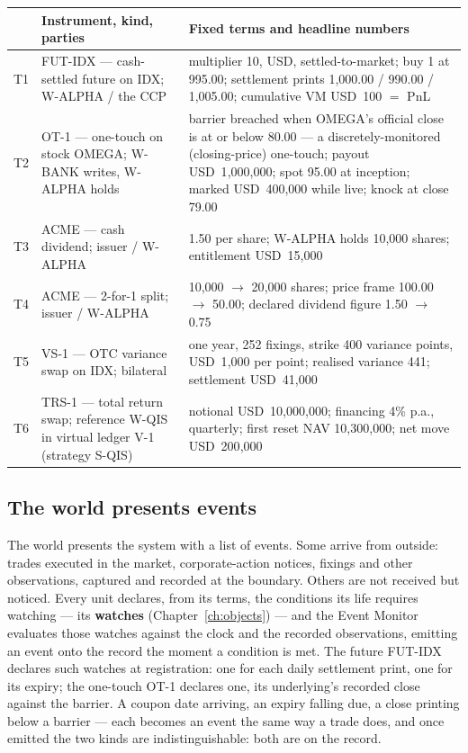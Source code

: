 \documentclass[11pt,a4paper]{article}
\newcommand{\USD}[1]{\mbox{USD~#1}}
\begin{document}
\medskip
{\small
\noindent\begin{tabular}{@{}lp{4.1cm}p{9.4cm}@{}}
\toprule
 & Instrument, kind, parties & Fixed terms and headline numbers \\
\midrule
T1 & FUT-IDX --- cash-settled future on IDX; W-ALPHA / the CCP & multiplier 10, USD,
  settled-to-market; buy 1 at 995.00; settlement prints 1{,}000.00 / 990.00 /
  1{,}005.00; cumulative VM \USD{100} $=$ PnL \\
T2 & OT-1 --- one-touch on stock OMEGA; W-BANK writes, W-ALPHA holds & barrier
  breached when OMEGA's official close is at or below 80.00 --- a discretely-monitored
  (closing-price) one-touch; payout \USD{1{,}000{,}000}; spot 95.00 at inception; marked
  \USD{400{,}000} while live; knock at close 79.00 \\
T3 & ACME --- cash dividend; issuer / W-ALPHA & 1.50 per share; W-ALPHA holds 10{,}000
  shares; entitlement \USD{15{,}000} \\
T4 & ACME --- 2-for-1 split; issuer / W-ALPHA & 10{,}000 $\to$ 20{,}000 shares; price
  frame 100.00 $\to$ 50.00; declared dividend figure 1.50 $\to$ 0.75 \\
T5 & VS-1 --- OTC variance swap on IDX; bilateral & one year, 252 fixings, strike 400
  variance points, \USD{1{,}000} per point; realised variance 441; settlement
  \USD{41{,}000} \\
T6 & TRS-1 --- total return swap; reference W-QIS in virtual ledger V-1 (strategy S-QIS) &
  notional \USD{10{,}000{,}000}; financing 4\% p.a., quarterly; first reset NAV
  10{,}300{,}000; net move \USD{200{,}000} \\
\bottomrule
\end{tabular}
}
\medskip

\subsection{The world presents events}

The world presents the system with a list of events. Some arrive from outside: trades
executed in the market, corporate-action notices, fixings and other observations,
captured and recorded at the boundary. Others are not received but noticed. Every unit
declares, from its terms, the conditions its life requires watching --- its
\textbf{watches} (Chapter~\ref{ch:objects}) --- and the Event Monitor evaluates those
watches against the clock and the recorded observations, emitting an event onto the
record the moment a condition is met. The future FUT-IDX declares such watches at
registration: one for each daily settlement print, one for its expiry; the one-touch OT-1
declares one, its underlying's recorded close against the barrier. A coupon date
arriving, an expiry falling due, a close printing below a barrier --- each becomes an
event the same way a trade does, and once emitted the two kinds are indistinguishable:
both are on the record.
\end{document}
